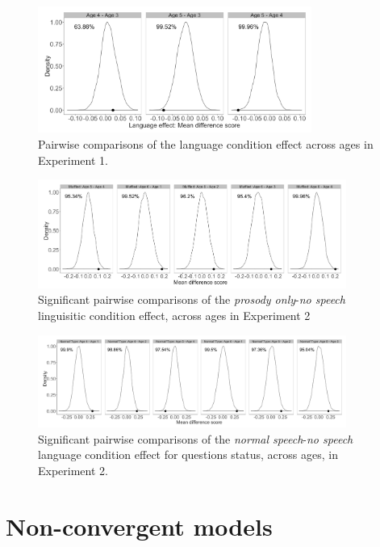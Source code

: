 \documentclass[authoryear, 12pt]{elsarticle}
\begin{document}
\begin{figure}[!htb]
\begin{center}
\includegraphics[width=0.8\textwidth]{figures/E1-child-randvsreal-ttest-agebylg.png}
\end{center}
\caption{Pairwise comparisons of the language condition effect across ages in Experiment 1.} 
\label{fig:E1-lgageinteraction}
\end{figure}

\begin{figure}[!htb]
\begin{center}
\includegraphics[width=0.9\textwidth]{figures/E2-child-randvsreal-ttest-muffledages.png}
\end{center}
\caption{Significant pairwise comparisons of the \textit{prosody only}-\textit{no speech} linguisitic condition effect, across ages in Experiment 2} 
\label{fig:E2-lgageinteraction}
\end{figure}

\begin{figure}[!htb]
\begin{center}
\includegraphics[width=0.9\textwidth]{figures/E2-child-randvsreal-ttest-normaltypesages.png}
\end{center}
\caption{Significant pairwise comparisons of the \textit{normal speech}-\textit{no speech} language condition effect for questions status, across ages, in Experiment 2.} 
\label{fig:E2-lgagetypeinteraction}
\end{figure}

\section{Non-convergent models}
\setcounter{figure}{0}  
\end{document}
